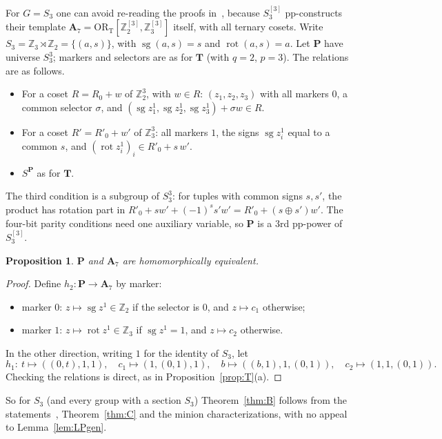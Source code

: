 \documentclass[11pt]{article}
\newtheorem{proposition}[theorem]{Proposition}
\theoremstyle{definition}
\theoremstyle{remark}
\newcommand{\Z}{\mathbb Z}
\newcommand{\sg}{\operatorname{sg}}
\newcommand{\rot}{\operatorname{rot}}
\newcommand{\ORT}{\mathrm{OR}_{\mathrm T}}
\begin{document}
For $G=S_3$ one can avoid re-reading the proofs in~\cite{LP25}, because $S_3^{[3]}$
pp-constructs their template $\mathbf A_7=\ORT[\Z_2^{[3]},\Z_3^{[3]}]$ itself,
with all ternary cosets. Write $S_3=\Z_3\rtimes\Z_2=\{(a,s)\}$, with $\sg(a,s)=s$
and $\rot(a,s)=a$. Let $\mathbf P$ have universe $S_3^3$; markers and selectors
are as for $\mathbf T$ (with $q=2$, $p=3$). The relations are as follows.
\begin{itemize}
\item For a coset $R=R_0+w$ of $\Z_2^3$, with $w\in R$: $(z_1,z_2,z_3)$ with all
markers $0$, a common selector $\sigma$, and
$(\sg z_1^1,\sg z_2^1,\sg z_3^1)+\sigma w\in R$.
\item For a coset $R'=R'_0+w'$ of $\Z_3^3$: all markers $1$, the signs $\sg z_i^1$
equal to a common $s$, and $(\rot z_i^1)_i\in R'_0+s\,w'$.
\item $S^{\mathbf P}$ as for $\mathbf T$.
\end{itemize}
The third condition is a subgroup of $S_3^3$: for tuples with common signs $s,s'$,
the product has rotation part in $R'_0+sw'+(-1)^s s'w'=R'_0+(s\oplus s')w'$. The
four-bit parity conditions need one auxiliary variable, so $\mathbf P$ is a $3$rd
pp-power of $S_3^{[3]}$.

\begin{proposition}\label{prop:equiv}
$\mathbf P$ and $\mathbf A_7$ are homomorphically equivalent.
\end{proposition}
\begin{proof}
Define $h_2\colon\mathbf P\to\mathbf A_7$ by marker:
\begin{itemize}
\item marker $0$: $z\mapsto\sg z^1\in\Z_2$ if the selector is $0$, and
$z\mapsto c_1$ otherwise;
\item marker $1$: $z\mapsto\rot z^1\in\Z_3$ if $\sg z^1=1$, and $z\mapsto c_2$
otherwise.
\end{itemize}
In the other direction, writing $1$ for the identity of $S_3$, let
\[
h_1\colon\ t\mapsto((0,t),1,1),\quad c_1\mapsto(1,(0,1),1),\quad
b\mapsto((b,1),1,(0,1)),\quad c_2\mapsto(1,1,(0,1)).
\]
Checking the relations is direct, as in Proposition~\ref{prop:T}(a).
\end{proof}

So for $S_3$ (and every group with a section $S_3$) Theorem~\ref{thm:B} follows
from the statements~\cite[Thm.~1.1, Thm.~5.2]{LP25}, Theorem~\ref{thm:C} and the
minion characterizations, with no appeal to Lemma~\ref{lem:LPgen}.
\end{document}
